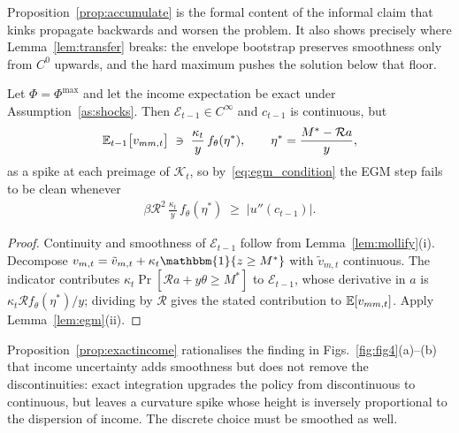Proposition~\ref{prop:accumulate} is the formal content of the informal claim that
kinks propagate backwards and worsen the problem. It also shows precisely where
Lemma~\ref{lem:transfer} breaks: the envelope bootstrap preserves smoothness only from
$C^{0}$ upwards, and the hard maximum pushes the solution below that floor.

\begin{proposition}
\label{prop:exactincome}
Let $\Phi=\Phi^{\max}$ and let the income expectation be exact under
Assumption~\ref{as:shocks}. Then $\mathcal{E}_{t-1}\in C^{\infty}$ and $c_{t-1}$ is
continuous, but
\begin{align}
\mathbb{E}_{t-1}\big[v_{mm,t}\big] \;\ni\; \frac{\kappa_t}{y}\,f_\theta(\eta^{\ast}),
\qquad \eta^{\ast}=\frac{M^{\ast}-\mathcal{R}a}{y},
\end{align}
as a spike at each preimage of $\mathcal{K}_t$, so by~\eqref{eq:egm_condition} the EGM
step fails to be clean whenever
\begin{align}
\beta\mathcal{R}^{2}\,\frac{\kappa_t}{y}\,f_\theta(\eta^{\ast})
\;\ge\; \big|u''(c_{t-1})\big| .
\label{eq:income_threshold}
\end{align}
\end{proposition}

\begin{proof}
Continuity and smoothness of $\mathcal{E}_{t-1}$ follow from
Lemma~\ref{lem:mollify}(i). Decompose $v_{m,t}=\tilde v_{m,t}+\kappa_t\mathbbm{1}\{z\ge M^{\ast}\}$
with $\tilde v_{m,t}$ continuous. The indicator contributes
$\kappa_t\Pr[\mathcal{R}a+y\theta\ge M^{\ast}]$ to $\mathcal{E}_{t-1}$, whose derivative in
$a$ is $\kappa_t\mathcal{R}f_\theta(\eta^{\ast})/y$; dividing by $\mathcal{R}$ gives the
stated contribution to $\mathbb{E}[v_{mm,t}]$. Apply Lemma~\ref{lem:egm}(ii).
\end{proof}

Proposition~\ref{prop:exactincome} rationalises the finding in
Figs.~\ref{fig:fig4}(a)--(b) that income uncertainty adds smoothness but does not
remove the discontinuities: exact integration upgrades the policy from discontinuous to
continuous, but leaves a curvature spike whose height is inversely proportional to the
dispersion of income. The discrete choice must be smoothed as well.

